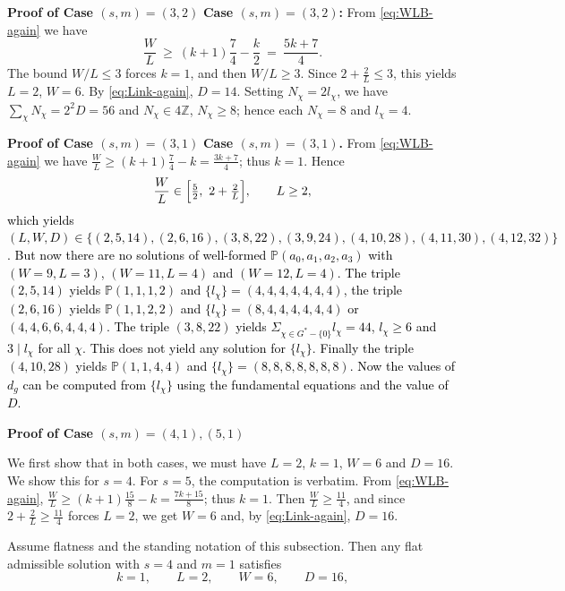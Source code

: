 \documentclass[12pt,twoside,]{amsart}
\theoremstyle{plain}
\theoremstyle{definition}
\begin{document}
\smallskip

\noindent\textbf{Proof of Case $(s,m)=(3,2)$}\label{s = 3, m = 2}
\textbf{Case $(s,m)=(3,2)$:}
From \eqref{eq:WLB-again} we have
\[
\frac{W}{L}\ \ge\ (k+1)\frac{7}{4}-\frac{k}{2}\ =\ \frac{5k+7}{4}.
\]
The bound $W/L\le 3$ forces $k=1$, and then $W/L\ge 3$. Since $2+\frac{2}{L}\le 3$, this yields $L=2$, $W=6$.
By \eqref{eq:Link-again}, $D=14$. Setting $N_{\chi} = 2l_{\chi}$, we have $\sum_\chi N_\chi=2^{2}D=56$ and $N_\chi\in 4\mathbb Z$, $N_\chi\ge 8$;
hence each $N_\chi=8$ and $l_\chi=4$. 

\smallskip

\noindent\textbf{Proof of Case $(s,m)=(3,1)$}\label{s = 3, m = 1}
\textbf{Case $(s,m)=(3,1)$.}
From \eqref{eq:WLB-again} we have $\frac{W}{L}\ge (k+1)\frac{7}{4}-k=\frac{3k+7}{4}$; thus $k=1$.
Hence
\[
\frac{W}{L}\in\Bigl[\tfrac{5}{2},\ 2+\tfrac{2}{L}\Bigr],\qquad L\ge 2,
\]
\textcolor{black}{which yields $(L,W,D)\in\{(2,5,14),(2,6,16),(3,8,22), (3,9,24), (4,10,28), (4,11,30), (4,12,32)\}$. But now there are no solutions of well-formed $\mathbb{P}(a_0,a_1,a_2,a_3)$ with $(W = 9, L = 3)$, $(W = 11, L = 4)$ and $(W = 12, L = 4)$. The triple $(2,5,14)$ yields $\mathbb{P}(1,1,1,2)$ and $\{l_{\chi}\} = (4,4,4,4,4,4,4)$, the triple $(2,6,16)$ yields $\mathbb{P}(1,1,2,2)$ and $\{l_{\chi}\} = (8,4,4,4,4,4,4)$ or $(4,4,6,6,4,4,4)$. The triple $(3,8,22)$ yields $\Sigma_{\chi \in G^*-\{0\}} l_{\chi} = 44$, $l_{\chi} \geq 6$ and $3 \mid l_{\chi}$ for all $\chi$. This does not yield any solution for $\{l_{\chi}\}$. Finally the triple $(4,10,28)$ yields $\mathbb{P}(1,1,4,4)$ and $\{l_{\chi}\} = (8,8,8,8,8,8,8)$. Now the values of $d_g$ can be computed from $\{l_{\chi}\}$ using the fundamental equations and the value of $D$.}

\smallskip

\noindent\textbf{Proof of Case $(s,m)=(4,1), (5,1)$}\label{s = 4,5 m = 1}

We first show that in both cases, we must have $L = 2$, $k = 1$, $W = 6$ and $D = 16$. We show this for $s = 4$. For $s = 5$, the computation is verbatim.
From \eqref{eq:WLB-again}, $\frac{W}{L}\ge (k+1)\frac{15}{8}-k=\frac{7k+15}{8}$; thus $k=1$. Then
$\frac{W}{L}\ge \frac{11}{4}$, and since $2+\frac{2}{L}\ge \frac{11}{4}$ forces $L=2$, we get $W=6$ and, by \eqref{eq:Link-again},
$D=16$. 


Assume flatness and the standing notation of this subsection. Then any flat admissible solution with $s=4$ and $m=1$
satisfies
\[
k=1,\qquad L=2,\qquad W=6,\qquad D=16,
\]
\end{document}
